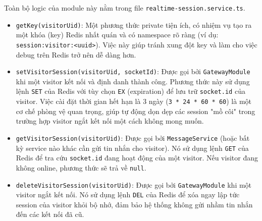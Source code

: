 Toàn bộ logic của module này nằm trong file \texttt{realtime-session.service.ts}.

\begin{itemize}
    \item \texttt{getKey(visitorUid)}: Một phương thức private tiện ích, có nhiệm vụ tạo ra một khóa (key) Redis nhất quán và có namespace rõ ràng (ví dụ: \texttt{session:visitor:<uuid>}). Việc này giúp tránh xung đột key và làm cho việc debug trên Redis trở nên dễ dàng hơn.
    
    \item \texttt{setVisitorSession(visitorUid, socketId)}: Được gọi bởi \texttt{GatewayModule} khi một visitor kết nối và định danh thành công. Phương thức này sử dụng lệnh \texttt{SET} của Redis với tùy chọn \texttt{EX} (expiration) để lưu trữ \texttt{socket.id} của visitor. Việc cài đặt thời gian hết hạn là 3 ngày (\texttt{3 * 24 * 60 * 60}) là một cơ chế phòng vệ quan trọng, giúp tự động dọn dẹp các session "mồ côi" trong trường hợp visitor ngắt kết nối một cách không mong muốn.
    
    \item \texttt{getVisitorSession(visitorUid)}: Được gọi bởi \texttt{MessageService} (hoặc bất kỳ service nào khác cần gửi tin nhắn cho visitor). Nó sử dụng lệnh \texttt{GET} của Redis để tra cứu \texttt{socket.id} đang hoạt động của một visitor. Nếu visitor đang không online, phương thức sẽ trả về \texttt{null}.
    
    \item \texttt{deleteVisitorSession(visitorUid)}: Được gọi bởi \texttt{GatewayModule} khi một visitor ngắt kết nối. Nó sử dụng lệnh \texttt{DEL} của Redis để xóa ngay lập tức session của visitor khỏi bộ nhớ, đảm bảo hệ thống không gửi nhầm tin nhắn đến các kết nối đã cũ.
\end{itemize}